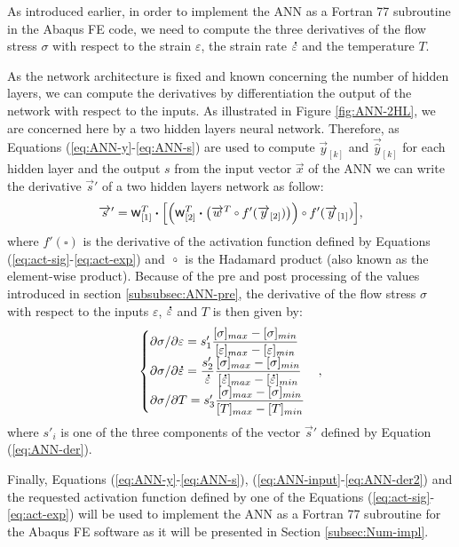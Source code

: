 \documentclass[algorithms,article,submit,pdftex,moreauthors]{Definitions/mdpi}
\DeclareRobustCommand{\w}{\mbox{\large\ensuremath{\mathsf{w}}}}
\DeclareRobustCommand{\dotp}{\boldsymbol{\cdot}}
\DeclareRobustCommand{\lay}[1]{_{[#1]}}
\DeclareRobustCommand{\mdot}[1]{\accentset{\mbox{\bfseries .}}{#1}}
\DeclareRobustCommand{\ccirc}{\kern0.5ex\vcenter{\hbox{$\scriptstyle\circ$}}\kern0.5ex}
\begin{document}
As introduced earlier, in order to implement the ANN as a Fortran 77 subroutine in the Abaqus FE code, we need to compute the three derivatives of the flow stress $\sigma$ with respect to the strain $\varepsilon$, the strain rate $\mdot{\varepsilon}$ and the temperature $T$.

As the network architecture is fixed and known concerning the number of hidden layers, we can compute the derivatives by differentiation the output of the network with respect to the inputs.
As illustrated in Figure \ref{fig:ANN-2HL}, we are concerned here by a two hidden layers neural network. Therefore, as Equations (\ref{eq:ANN-y}-\ref{eq:ANN-s}) are used to compute  $\overrightarrow{y}\lay{k}$ and $\overrightarrow{\hat{y}}\lay{k}$ for each hidden layer and the output $s$ from the input vector $\overrightarrow{x}$ of the ANN we can write the derivative $\overrightarrow{s}'$ of a two hidden layers network as follow:
\begin{equation}
\overrightarrow{s}' = \w\lay{1}^T \dotp\left[\left(\w\lay{2}^T \dotp \left(\overrightarrow{w}^T \ccirc f'(\overrightarrow{y}\lay{2})\right)\right) \ccirc f'(\overrightarrow{y}\lay{1})\right] \label{eq:ANN-der},
\end{equation}
where $f'\left(\square\right)$ is the derivative of the activation function defined by Equations (\ref{eq:act-sig}-\ref{eq:act-exp}) and $\ccirc$ is the Hadamard product (also known as the element-wise product).
Because of the pre and post processing of the values introduced in section \ref{subsubsec:ANN-pre}, the derivative of the flow stress $\sigma$ with respect to the inputs $\varepsilon$, $\mdot{\varepsilon}$ and $T$ is then given by:
\begin{equation}
\begin{cases}
\partial \sigma/\partial \varepsilon = s'_1 \dfrac{[\sigma]_{max} -[\sigma]_{min}}{[\varepsilon]_{max} -[\varepsilon]_{min}}\\
\partial \sigma/\partial\mdot{\varepsilon} = \dfrac{s'_2}{\mdot{\varepsilon}} \dfrac{[\sigma]_{max} -[\sigma]_{min}}{[\mdot{\varepsilon}]_{max} -[\mdot{\varepsilon}]_{min}} \\
\partial \sigma/\partial T = s'_3 \dfrac{[\sigma]_{max} -[\sigma]_{min}}{[T]_{max} -[T]_{min}}
\end{cases}
\label{eq:ANN-der2},
\end{equation}
where $s'_i$ is one of the three components of the vector $\overrightarrow{s}'$ defined by Equation (\ref{eq:ANN-der}).

Finally, Equations (\ref{eq:ANN-y}-\ref{eq:ANN-s}), (\ref{eq:ANN-input}-\ref{eq:ANN-der2}) and the requested activation function defined by one of the Equations (\ref{eq:act-sig}-\ref{eq:act-exp}) will be used to implement the ANN as a Fortran 77 subroutine for the Abaqus FE software as it will be presented in Section \ref{subsec:Num-impl}.
\end{document}
